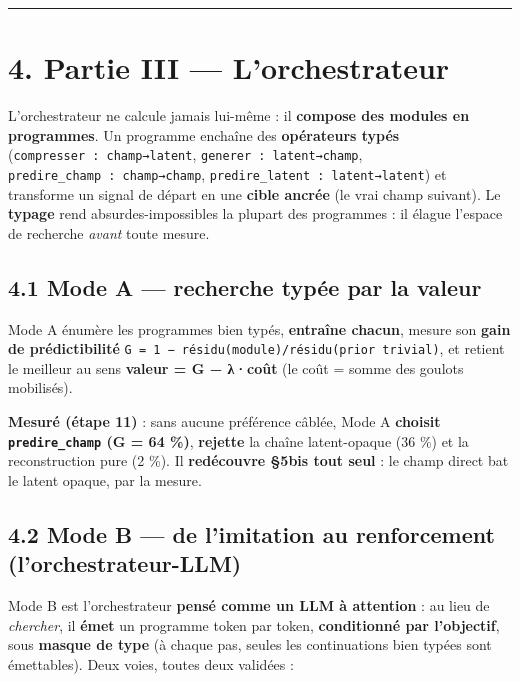 \documentclass[
  french,
  11pt,
]{article}
\begin{document}
\begin{center}\rule{0.5\linewidth}{0.5pt}\end{center}

\section{4. Partie III ---
L'orchestrateur}\label{partie-iii-lorchestrateur}

L'orchestrateur ne calcule jamais lui-même : il \textbf{compose des
modules en programmes}. Un programme enchaîne des \textbf{opérateurs
typés} (\texttt{compresser\ :\ champ→latent},
\texttt{generer\ :\ latent→champ},
\texttt{predire\_champ\ :\ champ→champ},
\texttt{predire\_latent\ :\ latent→latent}) et transforme un signal de
départ en une \textbf{cible ancrée} (le vrai champ suivant). Le
\textbf{typage} rend absurdes-impossibles la plupart des programmes : il
élague l'espace de recherche \emph{avant} toute mesure.

\subsection{4.1 Mode A --- recherche typée par la
valeur}\label{mode-a-recherche-typuxe9e-par-la-valeur}

Mode A énumère les programmes bien typés, \textbf{entraîne chacun},
mesure son \textbf{gain de prédictibilité}
\texttt{G\ =\ 1\ −\ résidu(module)/résidu(prior\ trivial)}, et retient
le meilleur au sens \textbf{valeur = G − λ·coût} (le coût = somme des
goulots mobilisés).

\textbf{Mesuré (étape 11)} : sans aucune préférence câblée, Mode A
\textbf{choisit \texttt{predire\_champ} (G = 64 \%)}, \textbf{rejette}
la chaîne latent-opaque (36 \%) et la reconstruction pure (2 \%). Il
\textbf{redécouvre §5bis tout seul} : le champ direct bat le latent
opaque, par la mesure.

\subsection{4.2 Mode B --- de l'imitation au renforcement
(l'orchestrateur-LLM)}\label{mode-b-de-limitation-au-renforcement-lorchestrateur-llm}

Mode B est l'orchestrateur \textbf{pensé comme un LLM à attention} : au
lieu de \emph{chercher}, il \textbf{émet} un programme token par token,
\textbf{conditionné par l'objectif}, sous \textbf{masque de type} (à
chaque pas, seules les continuations bien typées sont émettables). Deux
voies, toutes deux validées :
\end{document}
